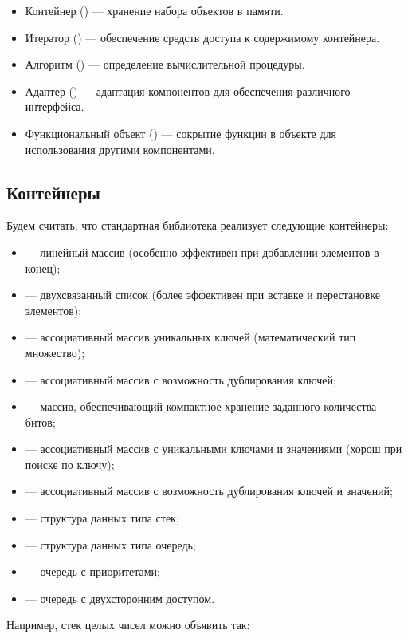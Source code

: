 \begin{itemize}
\item Контейнер () --- хранение набора объектов в памяти.
\item Итератор () --- обеспечение средств доступа к содержимому контейнера.
\item Алгоритм () --- определение вычислительной процедуры.
\item Адаптер () --- адаптация компонентов для обеспечения различного интерфейса.
\item Функциональный объект () --- сокрытие функции в объекте для использования другими
компонентами.
\end{itemize}

\subsection[Контейнеры]{Контейнеры}
Будем считать, что стандартная библиотека реализует следующие контейнеры:

\begin{itemize}
\item {} --- линейный массив (особенно эффективен при добавлении элементов в конец);
\item {} --- двухсвязанный список (более эффективен при вставке и перестановке элементов);
\item {} --- ассоциативный массив уникальных ключей (математический тип множество);
\item {} --- ассоциативный массив с возможность дублирования ключей;
\item {} --- массив, обеспечивающий компактное хранение заданного количества битов;
\item {} --- ассоциативный массив с уникальными ключами и значениями (хорош при поиске по ключу);
\item {} --- ассоциативный массив с возможность дублирования ключей и значений;
\item {} --- структура данных типа стек;
\item {} --- структура данных типа очередь;
\item {} --- очередь с приоритетами;
\item {} --- очередь с двухсторонним доступом.
\end{itemize}
Например, стек целых чисел можно объявить так:

